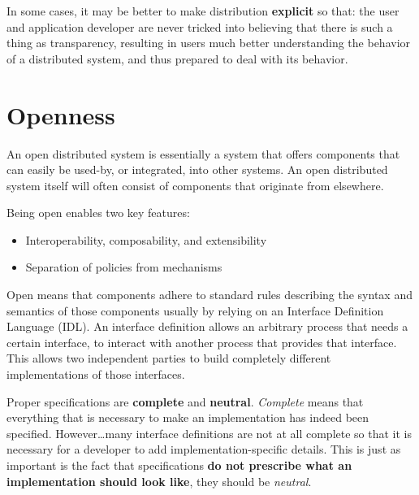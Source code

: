 In some cases, it may be better to make distribution \textbf{explicit} so that:
the user and application developer are never tricked into believing
that there is such a thing as transparency, resulting in users much better understanding the
behavior of a distributed system, and thus prepared to deal with its behavior.

\section{Openness}

An open distributed system is essentially a system that offers components that can easily be used-by, or integrated, into other systems. 
An open distributed system itself will often consist of components that originate from elsewhere.

Being open enables two key features:
\begin{itemize}
   \item Interoperability, composability, and extensibility
   \item Separation of policies from mechanisms
\end{itemize}

Open means that components adhere to standard rules describing the syntax and semantics of those components usually by relying on an Interface Definition Language (IDL).
An interface definition allows an arbitrary process that needs a certain interface, to interact with another process that provides that interface.
This allows two independent parties to build completely different implementations of those interfaces.

Proper specifications are \textbf{complete} and \textbf{neutral}.
\textit{Complete} means that everything that is necessary to make an implementation has indeed been specified.
However\dots many interface definitions are not at all complete so that it is necessary for a developer to add implementation-specific details.
This is just as important is the fact that specifications \textbf{do not prescribe what an implementation should look like}, they should be \textit{neutral}.




